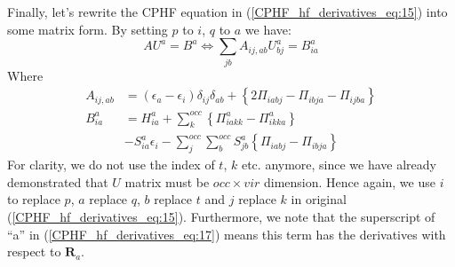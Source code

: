 Finally, let's rewrite the CPHF equation in (\ref{CPHF_hf_derivatives_eq:15})
into some matrix form. By setting $p$ to $i$, $q$ to $a$ we have:
\begin{equation}
  \label{CPHF_hf_derivatives_eq:17}
AU^{a} = B^{a}\Leftrightarrow \sum_{jb}A_{ij, ab}U^{a}_{bj} =
B^{a}_{ia}
\end{equation}
Where
\begin{equation}
\begin{split}
 A_{ij, ab} &= \left(\epsilon_{a} - \epsilon_{i}\right)\delta_{ij}\delta_{ab} + 
\left\{ 2\Pi_{iabj} -
    \Pi_{ibja} - \Pi_{ijba} \right\} \\
B^{a}_{ia} &= H^{a}_{ia} + \sum_{k}^{occ}\left \{\Pi^{a}_{iakk} - \Pi^{a}_{ikka}
  \right\}  \\
  &-S^{a}_{ia}\epsilon_{i} - \sum_{j}^{occ}\sum_{b}^{occ}S^{a}_{jb}
  \left\{ \Pi_{iabj} - \Pi_{ibja} \right\} 
\end{split}
 \label{CPHF_hf_derivatives_eq:18}
\end{equation}
For clarity, we do not use the index of $t$, $k$ etc. anymore, since
we have already demonstrated that $U$ matrix must be $occ\times vir$ dimension.
Hence again, we use $i$ to replace $p$, $a$ replace $q$, $b$ replace $t$ and $j$
replace $k$ in original (\ref{CPHF_hf_derivatives_eq:15}). Furthermore, we note
that the superscript of ``a'' in (\ref{CPHF_hf_derivatives_eq:17}) means this
term has the derivatives with respect
to $\bm{R}_{a}$.  



